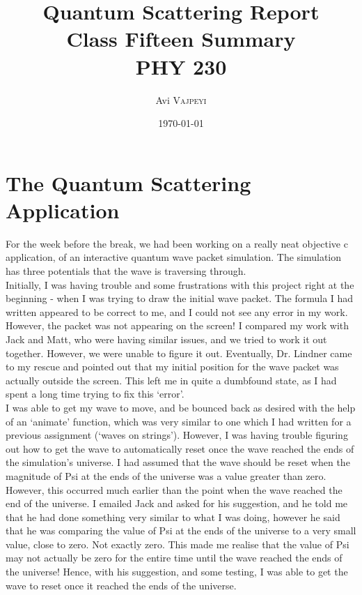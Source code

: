 \documentclass{article}
\title{Quantum Scattering Report\\ Class Fifteen Summary\\ PHY 230} %
\author{Avi \textsc{Vajpeyi}} %
\date{\today} %
\begin{document}
\maketitle %





\section{The Quantum Scattering Application}



For the week before the break, we had been working on a really neat objective c application, of an interactive quantum wave packet simulation. The simulation has three potentials that the wave is traversing through.\\

 Initially, I was having trouble and some frustrations with this project right at the beginning - when I was trying to draw the initial wave packet. The formula I had written appeared to be correct to me, and I could not see any error in my work. However, the packet was not appearing on the screen! I compared my work with Jack and Matt, who were having similar issues, and we tried to work it out together. However, we were unable to figure it out. Eventually, Dr. Lindner came to my rescue and pointed out that my initial position for the wave packet was actually outside the screen. This left me in quite a dumbfound state, as I had spent a long time trying to fix this `error'. \\
 
 I was able to get my wave to move, and be bounced back as desired with the help of an `animate' function, which was very similar to one which I had written for a previous assignment (`waves on strings'). However, I was having trouble figuring out how to get the wave to automatically reset once the wave reached the ends of the simulation's universe. I had assumed that the wave should be reset when the magnitude of Psi at the ends of the universe was a value greater than zero. However, this occurred much earlier than the point when the wave reached the end of the universe. I emailed Jack and asked for his suggestion, and he told me that he had done something very similar to what I was doing, however he said that he was comparing the value of Psi at the ends of the universe to a very small value, close to zero. Not exactly zero. This made me realise that the value of Psi may not actually be zero for the entire time until the wave reached the ends of the universe! Hence, with his suggestion, and some testing, I was able to get the wave to reset once it reached the ends of the universe.
 

\end{document}
